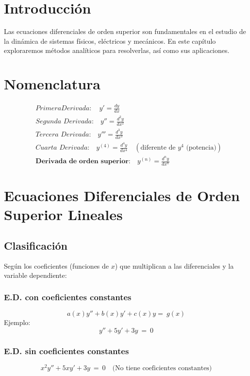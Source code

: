 \section{Introducción}
Las ecuaciones diferenciales de orden superior son fundamentales en el estudio de la dinámica de sistemas físicos, eléctricos y mecánicos. En este capítulo exploraremos métodos analíticos para resolverlas, así como sus aplicaciones.

\section{Nomenclatura}
\vspace{-20pt} %
\begin{align*}
 & \textit{}{Primera Derivada:} \quad y'=\frac{dy}{dx}\\
 & \textit{Segunda Derivada:} \quad y''=\frac{d^{2} y}{dx^{2}}\\
 & \textit{Tercera Derivada:} \quad y'''=\frac{d^{3} y}{dx^{3}}\\
 & \textit{Cuarta Derivada:} \quad y^{(4)} =\frac{d^{4} y}{dx^{4}} \quad (\text{diferente de } y^4 \text{ (potencia)})\\
 & \textbf{Derivada de orden superior:} \quad y^{(n)} =\frac{d^{n} y}{dx^{n}}
\end{align*}


\section{Ecuaciones Diferenciales de Orden Superior Lineales}

\subsection{Clasificación}

Según los coeficientes (funciones de \( x \)) que multiplican a las diferenciales y la variable dependiente:

\subsubsection{E.D. con coeficientes constantes}  
\[
a( x) y''+ b( x) y'+ c( x) y=\ g( x)
\]
Ejemplo:
\[
y''+5y'+3y\ =\ 0
\]
\subsubsection{E.D. sin coeficientes constantes}

\[
x^{2} y''+ 5x y'+ 3 y\ =\ 0 \quad \text{(No tiene coeficientes constantes)}
\]

